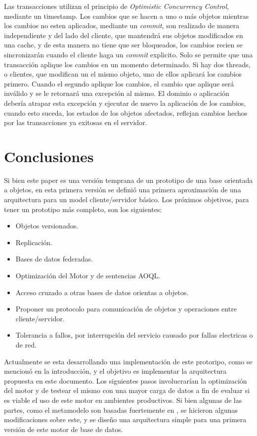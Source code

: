 \documentclass{melta}
\begin{document}
Las transacciones utilizan el principio de \textit{Optimistic Concurrency Control}, mediante un timestamp. Los cambios que se hacen a uno o más objetos mientras los cambios no esten aplicados, mediante un \textit{commit}, son realizado de manera independiente y del lado del cliente, que mantendrá sus objetos modificados en una cache, y de esta manera no tiene que ser bloqueados, los cambios recien se sincronizarán cuando el cliente haga un \textit{commit} explicito. Solo se permite que una transacción aplique los cambios en un momento determinado. Si hay dos threads, o clientes, que modifican un el mismo objeto, uno de ellos aplicará los cambios primero. Cuando el segundo aplique los cambios, el cambio que aplique será inválido y se le retornará una excepción al mismo. El dominio o aplicación debería atrapar esta excepción y ejecutar de nuevo la aplicación de los cambios, cuando esto suceda, los estados de los objetos afectados, reflejan cambios hechos por las transacciones ya exitosas en el servidor.

\section{Conclusiones}
\label{sec:conc}
Si bien este paper es una versión temprana de un prototipo de una base orientada a objetos, en esta primera versión se definió una primera aproximación de una arquitectura para un model cliente/servidor básico. Los próximos objetivos, para tener un prototipo más completo, son los siguientes:

\begin{itemize}
\item Objetos versionados.
\item Replicación.
\item Bases de datos federadas.
\item Optimización del Motor y de sentencias AOQL.
\item Acceso cruzado a otras bases de datos orientas a objetos.
\item Proponer un protocolo para comunicación de objetos y operaciones entre cliente/servidor.
\item Tolerancia a fallos, por interrupción del servicio causado por fallas electricas o de red.
\end{itemize}

Actualmente se esta desarrollando una implementación de este protoripo, como se mencionó en la introducción, y el objetivo es implementar la arquitectura propuesta en este documento. Los siguientes pasos involucrarían la optimización del motor y de testear el mismo con una mayor carga de datos a fin de evaluar si es viable el uso de este motor en ambientes productivos. 
Si bien algunas de las partes, como el metamodelo son basadas fuertemente en \cite{OMG:oodbs}, se hicieron algunas modificaciones sobre este, y se diseño una arquitectura simple para una primera versión de este motor de base de datos. 
\end{document}
